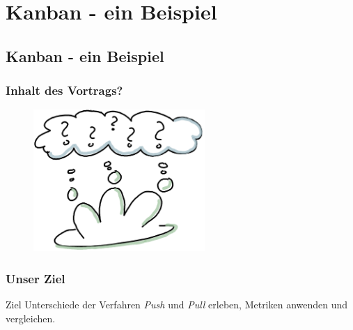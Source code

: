 \section{Kanban - ein Beispiel}

\subsection*{Kanban - ein Beispiel}

\begin{frame}
	\frametitle{Inhalt des Vortrags?}
		\begin{figure}[ht]
			\includegraphics[width=6.5cm]{Bilder/fragerunde.png}
		\end{figure}
\end{frame}

\begin{frame}
	\frametitle{Unser Ziel}
	\begin{exampleblock}{Ziel}
		Unterschiede der Verfahren \emph{Push} und \emph{Pull} erleben, Metriken anwenden und vergleichen.
	\end{exampleblock}
\end{frame}

